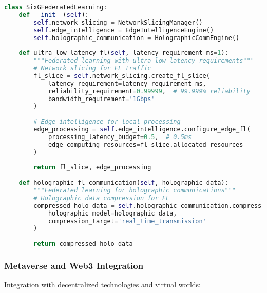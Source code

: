 \begin{lstlisting}[language=python, caption=6G Network Integration]
class SixGFederatedLearning:
    def __init__(self):
        self.network_slicing = NetworkSlicingManager()
        self.edge_intelligence = EdgeIntelligenceEngine()
        self.holographic_communication = HolographicCommEngine()
        
    def ultra_low_latency_fl(self, latency_requirement_ms=1):
        """Federated learning with ultra-low latency requirements"""
        # Network slicing for FL traffic
        fl_slice = self.network_slicing.create_fl_slice(
            latency_requirement=latency_requirement_ms,
            reliability_requirement=0.99999,  # 99.999% reliability
            bandwidth_requirement='1Gbps'
        )
        
        # Edge intelligence for local processing
        edge_processing = self.edge_intelligence.configure_edge_fl(
            processing_latency_budget=0.5,  # 0.5ms
            edge_computing_resources=fl_slice.allocated_resources
        )
        
        return fl_slice, edge_processing
        
    def holographic_fl_communication(self, holographic_data):
        """Federated learning for holographic communications"""
        # Holographic data compression for FL
        compressed_holo_data = self.holographic_communication.compress_holographic_model(
            holographic_model=holographic_data,
            compression_target='real_time_transmission'
        )
        
        return compressed_holo_data
\end{lstlisting}

\subsubsection{Metaverse and Web3 Integration}

Integration with decentralized technologies and virtual worlds:

